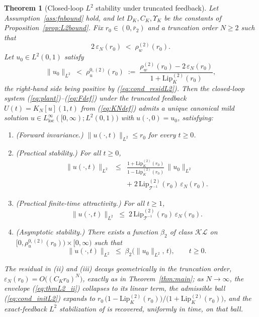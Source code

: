 \documentclass[amsthm]{autart}
\theoremstyle{plain}
\newtheorem{theorem}{Theorem}
\theoremstyle{definition}
\newcommand{\Tcal}{\mathcal{T}}
\newcommand{\Linf}{L^\infty}
\newcommand{\Ltwo}{L^2}
\newcommand{\Lipk}{\mathrm{Lip}_K}
\newcommand{\LipT}{\mathrm{Lip}_{\Tcal^{-1}}}
\newcommand{\eps}{\varepsilon}
\begin{document}
\begin{theorem}[Closed-loop $\Ltwo$ stability under truncated feedback]\label{thm:L2}
Let Assumption~\ref{ass:fnbound} hold, and let $D_K, C_K, \Upsilon_K$ be the constants of Proposition~\ref{prop:L2bound}. Fix $r_0 \in (0, \bar r_2)$ and a truncation order $N \ge 2$ such that
\begin{equation}
2\,\eps_N(r_0) \;<\; \rho_w^{(2)}(r_0).
\label{eq:cond_residL2}
\end{equation}
Let $u_0 \in \Ltwo(0,1)$ satisfy
\begin{equation}
\|u_0\|_{\Ltwo} \;<\; \rho_u^{0,(2)}(r_0) \;:=\; \frac{\rho_w^{(2)}(r_0) - 2\,\eps_N(r_0)}{1 + \Lipk^{(2)}(r_0)},
\label{eq:cond_initL2}
\end{equation}
the right-hand side being positive by (\ref{eq:cond_residL2}). Then the closed-loop system (\ref{eq:plant})--(\ref{eq:Fdef}) under the truncated feedback $U(t) = K_N[u](1,t)$ from (\ref{eq:KNdef}) admits a unique canonical mild solution $u \in \Linf_{\mathrm{loc}}([0,\infty); \Ltwo(0,1))$ with $u(\cdot,0) = u_0$, satisfying:
\begin{enumerate}[label=(\roman*)]
\item \emph{(Forward invariance.)} $\|u(\cdot,t)\|_{\Ltwo} \le r_0$ for every $t \ge 0$.
\item \emph{(Practical stability.)} For all $t \ge 0$,
\begin{eqnarray}
\|u(\cdot,t)\|_{\Ltwo} &\le& \frac{1 + \Lipk^{(2)}(r_0)}{1 - \Lipk^{(2)}(r_0)}\,\|u_0\|_{\Ltwo} \nonumber \\
&& +\; 2\,\LipT^{(2)}(r_0)\,\eps_N(r_0).
\label{eq:thmL2_ii}
\end{eqnarray}
\item \emph{(Practical finite-time attractivity.)} For all $t \ge 1$,
\begin{equation}
\|u(\cdot,t)\|_{\Ltwo} \;\le\; 2\,\LipT^{(2)}(r_0)\,\eps_N(r_0).
\label{eq:thmL2_iii}
\end{equation}
\item \emph{(Asymptotic stability.)} There exists a function $\beta_2$ of class $\mathcal{KL}$ on $[0, \rho_u^{0,(2)}(r_0)) \times [0,\infty)$ such that
\begin{equation}
\|u(\cdot,t)\|_{\Ltwo} \;\le\; \beta_2\bigl(\|u_0\|_{\Ltwo},\, t\bigr), \qquad t \ge 0.
\label{eq:thmL2_iv}
\end{equation}
\end{enumerate}
The residual in (ii) and (iii) decays geometrically in the truncation order, $\eps_N(r_0) = O\bigl((C_K r_0)^N\bigr)$, exactly as in Theorem~\ref{thm:main}; as $N \to \infty$, the envelope (\ref{eq:thmL2_ii}) collapses to its linear term, the admissible ball (\ref{eq:cond_initL2}) expands to $r_0\,\bigl(1 - \Lipk^{(2)}(r_0)\bigr)/\bigl(1 + \Lipk^{(2)}(r_0)\bigr)$, and the exact-feedback $\Ltwo$ stabilization of \cite{krstic2026feedbacklinearizationhyperbolicpdes} is recovered, uniformly in time, on that ball.
\end{theorem}
\end{document}
